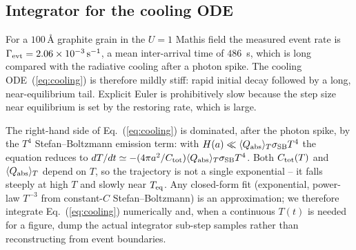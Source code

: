 \documentclass{my_memo}
\newcommand{\QplT}{\langle Q_{\rm abs} \rangle_T}
\newcommand{\Ctot}{C_{\rm tot}}
\newcommand{\Teq}{T_{\rm eq}}
\newcommand{\sigmaSB}{\sigma_{\rm SB}}
\begin{document}
\subsection{Integrator for the cooling ODE}

For a $100\,\textrm{\AA}$ graphite grain in the $U=1$ Mathis field the
measured event rate is $\Gamma_{\rm evt}=2.06\times10^{-3}\,{\rm s}^{-1}$,
a mean inter-arrival time of $486$~s, which is long compared with the
radiative cooling after a photon spike.  The cooling
ODE~(\ref{eq:cooling}) is therefore mildly stiff: rapid initial decay
followed by a long, near-equilibrium tail.  Explicit Euler is
prohibitively slow because the step size near equilibrium is set by
the restoring rate, which is large.

The right-hand side of Eq.~(\ref{eq:cooling}) is
dominated, after the photon spike, by the $T^4$ Stefan--Boltzmann
emission term: with $H(a)\ll \QplT \sigmaSB T^4$ the equation reduces
to $dT/dt \simeq -(4\pi a^2/\Ctot)\QplT\sigmaSB T^4$.  Both $\Ctot(T)$
and $\QplT$ depend on $T$, so the trajectory is
not a single exponential -- it falls steeply at high $T$ and slowly
near $\Teq$.  Any closed-form fit (exponential, power-law $T^{-3}$
from constant-$C$ Stefan--Boltzmann) is an approximation; we therefore
integrate Eq.~(\ref{eq:cooling}) numerically and, when a continuous
$T(t)$ is needed for a figure, dump the actual integrator sub-step
samples rather than reconstructing from event boundaries.
\end{document}
